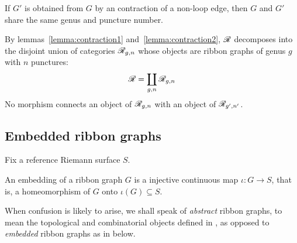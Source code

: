 \begin{lemma}\label{lemma:contraction2}
  If $G'$ is obtained from $G$ by an contraction of a non-loop edge,
  then $G$ and $G'$ share the same genus and puncture number.
\end{lemma}

By lemmas~\ref{lemma:contraction1} and~\ref{lemma:contraction2}, $\mathscr{R}$
decomposes into the disjoint union of categories $\mathscr{R}_{g,n}$ whose
objects are ribbon graphs of genus $g$ with $n$ punctures:
\begin{equation*}
  \mathscr{R} = \coprod_{g,n} \mathscr{R}_{g,n}
\end{equation*}
No morphism connects an object of $\mathscr{R}_{g,n}$ with an object of
$\mathscr{R}_{g',n'}$.


\subsection{Embedded ribbon graphs}
\label{sec:embedded-rg}

Fix a reference Riemann surface $S$.

An embedding of a ribbon graph $G$ is a injective continuous map $\iota:G\to
S$, that is, a homeomorphism of $G$ onto $\iota(G) \subseteq S$.

When confusion is likely to arise, we shall speak of \emph{abstract}
ribbon graphs, to mean the topological and combinatorial objects
defined in , as opposed to \emph{embedded}
ribbon graphs as in  below.


